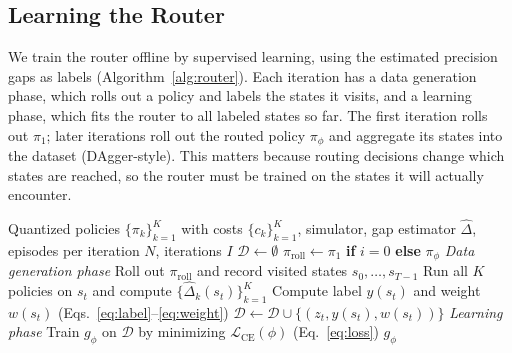 \documentclass[11pt]{article}
\begin{document}
\subsection{Learning the Router}

We train the router offline by supervised learning, using the
estimated precision gaps as labels
(Algorithm~\ref{alg:router}). Each iteration has a data generation
phase, which rolls out a policy and labels the states it visits, and a
learning phase, which fits the router to all labeled states so far.
The first iteration rolls out $\pi_1$; later iterations roll out the
routed policy $\pi_\phi$ and aggregate its states into the dataset
(DAgger-style). This matters because routing decisions change which
states are reached, so the router must be trained on the states it
will actually encounter.

\begin{algorithm}[!htbp]
\caption{Offline router learning}
\label{alg:router}
\begin{algorithmic}[1]
\Require Quantized policies $\{\pi_k\}_{k=1}^{K}$ with costs
    $\{c_k\}_{k=1}^{K}$, simulator, gap estimator $\hat{\Delta}$,
    episodes per iteration $N$, iterations $I$
\State $\mathcal{D} \gets \emptyset$
    \State $\pi_{\mathrm{roll}} \gets \pi_1$ \textbf{if} $i = 0$
        \textbf{else} $\pi_\phi$
    \Statex \textit{\quad Data generation phase}
        \State Roll out $\pi_{\mathrm{roll}}$ and record visited states
            $s_0, \dots, s_{T-1}$
            \State Run all $K$ policies on $s_t$ and compute
                $\{\hat{\Delta}_k(s_t)\}_{k=1}^{K}$
            \State Compute label $y(s_t)$ and weight $w(s_t)$
                (Eqs.~\eqref{eq:label}--\eqref{eq:weight})
            \State $\mathcal{D} \gets \mathcal{D} \cup
                \{(z_t, y(s_t), w(s_t))\}$
        \EndFor
    \EndFor
    \Statex \textit{\quad Learning phase}
    \State Train $g_\phi$ on $\mathcal{D}$ by minimizing
        $\mathcal{L}_{\mathrm{CE}}(\phi)$ (Eq.~\eqref{eq:loss})
\EndFor
\State \Return $g_\phi$
\end{algorithmic}
\end{algorithm}
\end{document}
